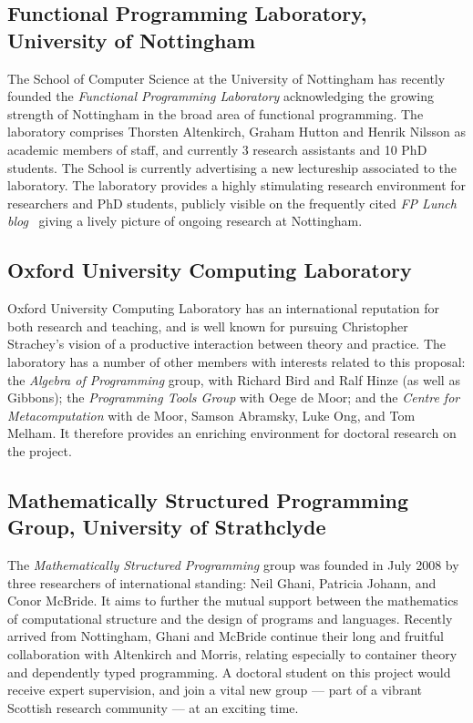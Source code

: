 \documentclass[a4paper]{article}
\begin{document}
\subsection*{Functional Programming Laboratory,\\ University of Nottingham}

The School of Computer Science at the University of Nottingham has
recently founded the \emph{Functional Programming Laboratory}
acknowledging the growing strength of Nottingham in the broad area of
functional programming. The laboratory comprises Thorsten
Altenkirch, Graham Hutton and Henrik Nilsson as academic members of
staff, and currently 3 research assistants and 10 PhD students.
The School is currently advertising a new lectureship associated to
the laboratory. The laboratory provides a highly stimulating research
environment for researchers and PhD students, publicly visible on the
frequently cited \emph{FP Lunch blog}~\cite{fplunchweb} giving a
lively picture of ongoing research at Nottingham.

\subsection*{Oxford University Computing Laboratory}

Oxford University Computing Laboratory has an international reputation
for both research and teaching, and is well known for pursuing
Christopher Strachey's vision of a productive interaction between
theory and practice.  The laboratory has a number of other members
with interests related to this proposal: the \textit{Algebra of
  Programming} group, with Richard Bird and Ralf Hinze (as well as
Gibbons); the \textit{Programming Tools Group} with Oege de Moor; and
the \textit{Centre for Metacomputation} with de Moor, Samson Abramsky,
Luke Ong, and Tom Melham. It therefore provides an enriching
environment for doctoral research on the project.

\subsection*{Mathematically Structured Programming Group, University of Strathclyde}
\label{sec:funct-progr-group}

The \emph{Mathematically Structured Programming} group was founded in
July 2008 by three researchers of international standing: Neil Ghani,
Patricia Johann, and Conor McBride. It aims to further the mutual
support between the mathematics of computational structure and the
design of programs and languages. Recently arrived from Nottingham,
Ghani and McBride continue their long and fruitful collaboration with
Altenkirch and Morris, relating especially to container theory and
dependently typed programming. A doctoral student on this project
would receive expert supervision, and join a vital new group --- part
of a vibrant Scottish research community --- at an exciting time.
\end{document}
